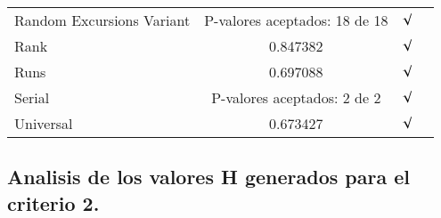 \documentclass[12pt,3p]{elsarticle}
\begin{document}
\begin{table}[H]
\begin{center}
\begin{small}
\begin{sc}
\begin{tabular}{lccr}
Random Excursions Variant &  P-valores aceptados: 18 de 18  &     $\surd$        \\

Rank &    0.847382   &        $\surd$         \\

Runs &    0.697088  &     $\surd$        \\

Serial &     P-valores aceptados: 2 de 2    &     $\surd$        \\

Universal &      0.673427 &   $\surd$            \\

\hline



\end{tabular}
\end{sc}
\end{small}
\end{center}
\vskip -0.1in
\end{table}



\subsection{Analisis de los valores H generados para el criterio 2.}
\end{document}
